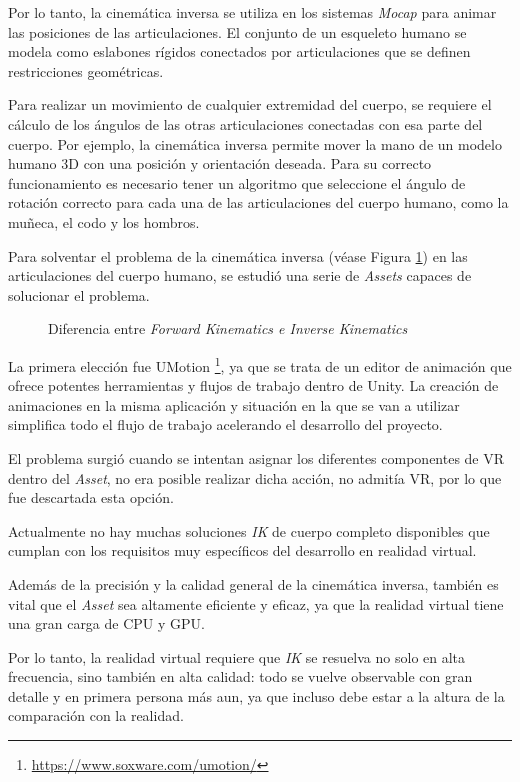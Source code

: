 Por lo tanto, la cinemática inversa se utiliza en los sistemas \textit{Mocap} para animar las posiciones de las articulaciones. El conjunto de un esqueleto humano se modela como eslabones rígidos conectados por articulaciones que se definen restricciones geométricas. 

Para realizar un movimiento de cualquier extremidad del cuerpo, se requiere el cálculo de los ángulos de las otras articulaciones conectadas con esa parte del cuerpo. Por ejemplo, la cinemática inversa permite mover la mano de un modelo humano 3D con una posición y orientación deseada. Para su correcto funcionamiento es necesario tener un algoritmo que seleccione el ángulo de rotación correcto para cada una de las articulaciones del cuerpo humano, como la muñeca, el codo y los hombros.

Para solventar el problema de la cinemática inversa (véase Figura \ref{fig:IK}) en las articulaciones del cuerpo humano, se estudió una serie de \textit{Assets} capaces de solucionar el problema.

\begin{figure}[h!]
    \centering
    \caption{Diferencia entre \textit{Forward Kinematics e Inverse Kinematics}}
    \label{fig:IK}  
\end{figure}

La primera elección fue UMotion \footnote{\url{ https://www.soxware.com/umotion/}}, ya que se trata de un editor de animación que ofrece potentes herramientas y flujos de trabajo dentro de Unity. La creación de animaciones en la misma aplicación y situación en la que se van a utilizar simplifica todo el flujo de trabajo acelerando el desarrollo del proyecto. 

El problema surgió cuando se intentan asignar los diferentes componentes de VR dentro del \textit{Asset}, no era posible realizar dicha acción, no admitía VR, por lo que fue descartada esta opción.

Actualmente no hay muchas soluciones \textit{IK} de cuerpo completo disponibles que cumplan con los requisitos muy específicos del desarrollo en realidad virtual.

Además de la precisión y la calidad general de la cinemática inversa, también es vital que el \textit{Asset} sea altamente eficiente y eficaz, ya que la realidad virtual tiene una gran carga de CPU y GPU. 

Por lo tanto, la realidad virtual requiere que \textit{IK} se resuelva no solo en alta frecuencia, sino también en alta calidad: todo se vuelve observable con gran detalle y en primera persona más aun, ya que incluso debe estar a la altura de la comparación con la realidad.

